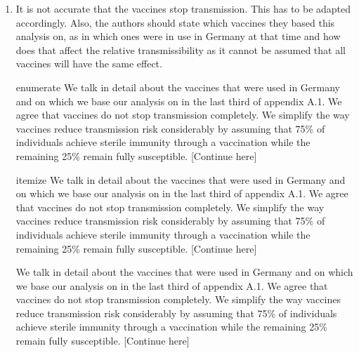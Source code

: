 \documentclass[a4paper,11pt]{article}
\makeatletter
\theoremstyle{plain}
\newlength{\parindentaux}
\newcommand*\@myenumerate{enumerate}
\newcommand*\@myitemize{itemize}
\newcommand{\response}[1]{{%
		\color{black}%
		\par\frenchspacing%
		\ifx\@currenvir\@myenumerate%
		\addtolength{\leftskip}{-\parindentaux}%
		\rm\noindent #1\par%
		\addtolength{\leftskip}{\parindentaux}%
		\else%
		\ifx\@currenvir\@myitemize%
		\addtolength{\leftskip}{-\parindentaux}%
		\rm\noindent #1\par%
		\addtolength{\leftskip}{\parindentaux}%
		\else%
		\rm\noindent #1\par%
		\fi%
		\fi%
}}
\makeatother
\begin{document}
{\begin{enumerate}
          \response{%
              We now cite our main reference for the susceptibilities for each age group also in the main text. We directly take the susceptibilities given by Davies et al. 2020, in their Extended Data Fig. 4.
              We base our assumption on infectiousness being independent of age on Jones et al. 2021. They report only slight differences in viral loads between German adults and children: ``The least infectious youngest children have 78\% (61, 94) of the peak culture probability of adults aged 45 to 55''. Furthermore, they caution that these lower numbers may be due to different sample taking - such as the usage of smaller pediatric swab devices - rather than actual lower viral loads and conclude that the differences, if existent, are likely not clinically relevant.
          }
    \item It is not accurate that the vaccines stop transmission. This has to be adapted accordingly. Also, the authors should state which vaccines they based this analysis on, as in which ones were in use in Germany at that time and how does that affect the relative transmissibility as it cannot be assumed that all vaccines will have the same effect.
          \response{%
              We talk in detail about the vaccines that were used in Germany and on which we base our analysis on in the last third of appendix A.1.
              We agree that vaccines do not stop transmission completely. We simplify the way vaccines reduce transmission risk considerably by assuming that 75\% of individuals achieve sterile immunity through a vaccination while the remaining 25\% remain fully susceptible. [Continue here]
          }
\end{enumerate}
}


% 
% 
\end{document}

